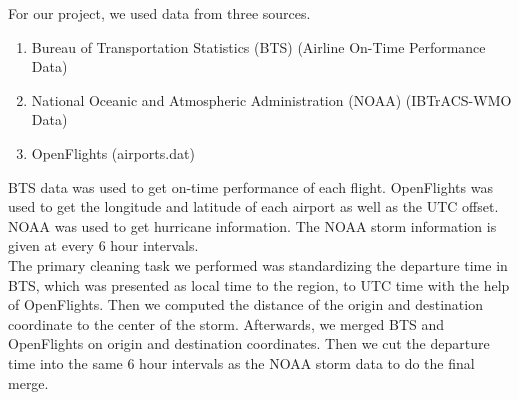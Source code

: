 
For our project, we used data from three sources.  
\begin{enumerate}
\item Bureau of Transportation Statistics (BTS) (Airline On-Time Performance Data) 
\item National Oceanic and Atmospheric Administration (NOAA) (IBTrACS-WMO Data)
\item OpenFlights (airports.dat)
\end{enumerate}

BTS data was used to get on-time performance of each flight. OpenFlights was used to get the longitude and latitude of each airport as well as the UTC offset. NOAA was used to get hurricane information. The NOAA storm information is given at every 6 hour intervals. \\

The primary cleaning task we performed was standardizing the departure time in BTS, which was presented as local time to the region, to UTC time with the help of OpenFlights. Then we computed the distance of the origin and destination coordinate to the center of the storm. Afterwards, we merged BTS and OpenFlights on origin and destination coordinates. Then we cut the departure time into the same 6 hour intervals as the NOAA storm data to do the final merge.